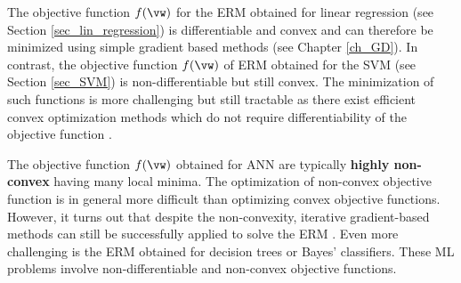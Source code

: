 \documentclass[12pt]{report}
\begin{document}
The objective function $f(\vw)$ for the ERM obtained for linear 
regression (see Section \ref{sec_lin_regression}) is differentiable 
and convex and can therefore be minimized using simple 
gradient based  methods (see Chapter \ref{ch_GD}). In contrast, 
the objective function $f(\vw)$ of ERM obtained for the SVM (see 
Section \ref{sec_SVM}) is non-differentiable but still convex. The 
minimization of such functions is more challenging but still tractable 
as there exist efficient convex optimization methods which do not 
require differentiability of the objective function \cite{ProximalMethods}. 

The objective function $f(\vw)$ obtained for ANN are typically 
{\bf highly non-convex} having many local minima. The optimization 
of non-convex objective function is in general more difficult than 
optimizing convex objective functions. However, it turns out that 
despite the non-convexity, iterative gradient-based methods can 
still be successfully applied to solve the ERM \cite{Goodfellow-et-al-2016}. 
Even more challenging is the ERM obtained for decision trees or 
Bayes' classifiers. These ML problems involve non-differentiable 
and non-convex objective functions. 
\end{document}
